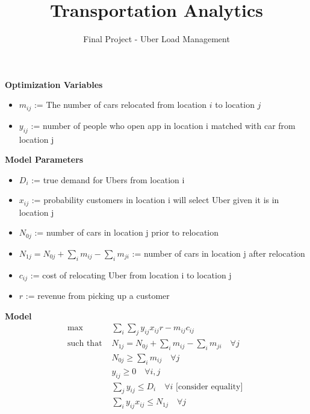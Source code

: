\documentclass[12pt]{article}
\begin{document}
 
 
\title{Transportation Analytics}
\author{Final Project - Uber Load Management}

\maketitle

\textbf{Optimization Variables}

\begin{itemize}
\item $m_{ij}$ := The number of cars relocated from location $i$ to location $j$
\item $y_{ij}$ := number of people who open app in location i matched with car from location j
\end{itemize}

\vspace{.3 in}

\textbf{Model Parameters}
\begin{itemize}
\item $D_i$ := true demand for Ubers from location i
\item $x_{ij}$ := probability customers in location i will select Uber given it is in location j
\item $N_{0j}$ := number of cars in location j prior to relocation
\item $N_{1j} = N_{0j} + \sum_im_{ij} - \sum_im_{ji}$ := number of cars in location j after relocation
\item $c_{ij}$ := cost of relocating Uber from location i to location j
\item $r$ := revenue from picking up a customer
\end{itemize}

\vspace{.3 in}

\textbf{Model}
\begin{align*}
\max & \sum_i\sum_j y_{ij}x_{ij}r - m_{ij}c_{ij} \\
\text{such that      } & N_{1j} = N_{0j} + \sum_i m_{ij} - \sum_i m_{ji} \quad \forall j\\
& N_{0j}\geq \sum_i m_{ij} \quad \forall j \\
& y_{ij} \geq 0 \quad \forall i, j\\
& \sum_j y_{ij} \leq D_i \quad \forall i \text{   [consider equality]   }\\
& \sum_i y_{ij}x_{ij}\leq N_{1j} \quad \forall j
\end{align*}
\end{document}
